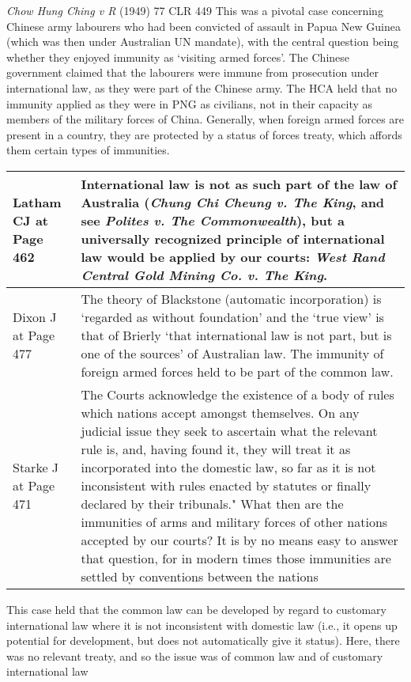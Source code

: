 \begin{casedetails}{\textit{Chow Hung Ching v R} (1949) 77 CLR 449}\label{case:Chow Hung Ching}
    \flushleft
    This was a pivotal case concerning Chinese army labourers who had been convicted of assault in Papua New Guinea (which was then under Australian UN mandate), with the central question being whether they enjoyed immunity as `visiting armed forces'. The Chinese government claimed that the labourers were immune from prosecution under international law, as they were part of the Chinese army. The HCA held that no immunity applied as they were in PNG as civilians, not in their capacity as members of the military forces of China. Generally, when foreign armed forces are present in a country, they are protected by a status of forces treaty, which affords them certain types of immunities. 

    \begin{longtable}{p{}|>{\raggedright\arraybackslash}p{}}
        Latham CJ at Page 462 & International law is not as such part of the law of Australia (\textit{Chung Chi Cheung v. The King}, and see \textit{Polites v. The Commonwealth}), but a universally recognized principle of international law would be applied by our courts: \textit{West Rand Central Gold Mining Co. v. The King}. \\\hline
        Dixon J at Page 477 & The theory of Blackstone (automatic incorporation) is `regarded as without foundation' and the `true view' is that of Brierly `that international law is not part, but is one of the sources' of Australian law. The immunity of foreign armed forces held to be part of the common law.\\\hline
        Starke J at Page 471 & The Courts acknowledge the existence of a body of rules which nations accept amongst themselves. On any judicial issue they seek to ascertain what the relevant rule is, and, having found it, they will treat it as incorporated into the domestic law, so far as it is not inconsistent with rules enacted by statutes or finally declared by their tribunals." What then are the immunities of arms and military forces of other nations accepted by our courts? It is by no means easy to answer that question, for in modern times those immunities are settled by conventions between the nations
    \end{longtable}

    This case held that the common law can be developed by regard to customary international law where it is not inconsistent with domestic law (i.e., it opens up potential for development, but does not automatically give it status). Here, there was no relevant treaty, and so the issue was of common law and of customary international law
\end{casedetails}

